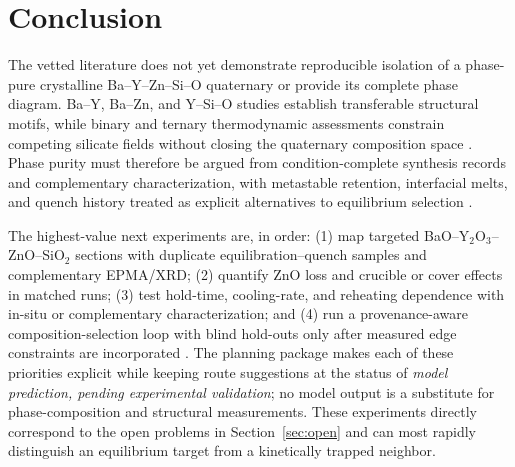 \section{Conclusion}

The vetted literature does not yet demonstrate reproducible isolation of a phase-pure crystalline Ba--Y--Zn--Si--O quaternary or provide its complete phase diagram. Ba--Y, Ba--Zn, and Y--Si--O studies establish transferable structural motifs, while binary and ternary thermodynamic assessments constrain competing silicate fields without closing the quaternary composition space \cite{kolitsch2006bay2si3o10,hulai2024navigation,kaiser2002crystal,ababaikeri2024ba,makrovets2023y2o3,jeon2025phase}. Phase purity must therefore be argued from condition-complete synthesis records and complementary characterization, with metastable retention, interfacial melts, and quench history treated as explicit alternatives to equilibrium selection \cite{kim2025key,mckenzie2021nucleation,zhang2026interfacial,zeng2024selective}.

The highest-value next experiments are, in order: (1) map targeted BaO--Y$_2$O$_3$--ZnO--SiO$_2$ sections with duplicate equilibration--quench samples and complementary EPMA\slash XRD; (2) quantify ZnO loss and crucible or cover effects in matched runs; (3) test hold-time, cooling-rate, and reheating dependence with in-situ or complementary characterization; and (4) run a provenance-aware composition-selection loop with blind hold-outs only after measured edge constraints are incorporated \cite{shevchenko2021integrated,thieme2022noble,wang2024optimal,chen2024navigating,zhang2026provmind}. The planning package makes each of these priorities explicit while keeping route suggestions at the status of \emph{model prediction, pending experimental validation}; no model output is a substitute for phase-composition and structural measurements. These experiments directly correspond to the open problems in Section~\ref{sec:open} and can most rapidly distinguish an equilibrium target from a kinetically trapped neighbor.
